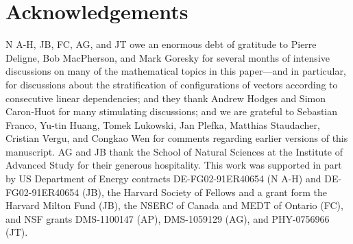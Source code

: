 \documentclass[12pt,hyperref,compress]{JHEP3}
\begin{document}
\newpage
\section*{Acknowledgements}
N A-H, JB, FC, AG, and JT owe an enormous debt of gratitude to Pierre Deligne, Bob MacPherson, and Mark Goresky for several months of intensive discussions on many of the mathematical topics in this paper---and in particular, for discussions about the stratification of configurations of vectors according to consecutive linear dependencies; and they thank Andrew Hodges and Simon Caron-Huot for many stimulating discussions; and we are grateful to Sebastian Franco, Yu-tin Huang, Tomek Lukowski, Jan Plefka, Matthias Staudacher, Cristian Vergu, and Congkao Wen for comments regarding earlier versions of this manuscript. AG and JB thank the School of Natural Sciences at the Institute of Advanced Study for their generous hospitality. This work was supported in part by US Department of Energy contracts \mbox{DE-FG02-91ER40654} (N A-H) and \mbox{DE-FG02-91ER40654} (JB), the Harvard Society of Fellows and a grant form the Harvard Milton Fund (JB), the NSERC of Canada and MEDT of Ontario (FC), and NSF grants DMS-1100147 (AP), DMS-1059129 (AG), and PHY-0756966 (JT). 
\end{document}

